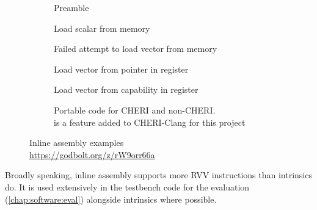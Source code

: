 \documentclass[../thesis]{subfiles}
\begin{document}
\begin{figure}[p]
    \centering
    \begin{subfigure}{0.6\textwidth}
        \caption{Preamble}
    \end{subfigure}

    \begin{subfigure}{0.49\textwidth}
        \caption{Load scalar from memory}\label{subfig:inline_asm_memory}
    \end{subfigure}\hfill%
    \begin{subfigure}{0.49\textwidth}
        \caption{Failed attempt to load vector from memory}\label{subfig:inline_asm_vector_memory}
    \end{subfigure}


    \begin{subfigure}{0.49\textwidth}
        \caption{Load vector from pointer in register}\label{subfig:inline_asm_vector_ptr_reg}
    \end{subfigure}\hfill%
    \begin{subfigure}{0.49\textwidth}
        \caption{Load vector from capability in register}\label{subfig:inline_asm_vector_cap_reg}
    \end{subfigure}

    \begin{subfigure}{0.6\textwidth}
        \centering
        \caption{Portable code for CHERI and non-CHERI.\\ is a feature added to CHERI-Clang for this project}\label{subfig:inline_asm_vector_portable}
    \end{subfigure}

    \caption{Inline assembly examples\\\url{https://godbolt.org/z/rW9orr66a}}
\end{figure}

Broadly speaking, inline assembly supports more RVV instructions than intrinsics do.
It is used extensively in the testbench code for the evaluation (\cref{chap:software:eval}) alongside intrinsics where possible.
\end{document}
